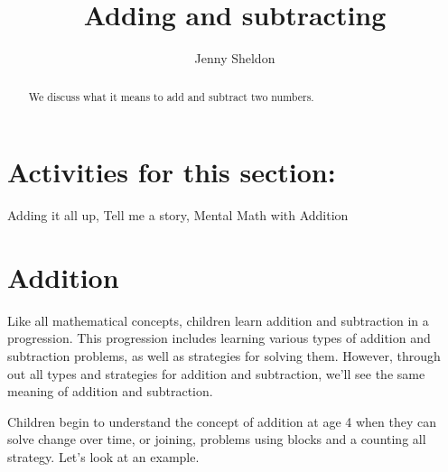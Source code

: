 \documentclass{ximera}
\title{Adding and subtracting}
\author{Jenny Sheldon}
\begin{document}
\begin{abstract}
We discuss what it means to add and subtract two numbers.
\end{abstract}
\maketitle

\section{Activities for this section:} Adding it all up, Tell me a story, Mental Math with Addition


\section{Addition}

Like all mathematical concepts, children learn addition and subtraction in a progression. This progression includes learning various types of addition and subtraction problems, as well as strategies for solving them. However, through out all types and strategies for addition and subtraction, we'll see the same meaning of addition and subtraction. 

Children begin to understand the concept of addition at age 4 when they can solve change over time, or joining, problems using blocks and a counting all strategy. Let's look at an example.
\end{document}
